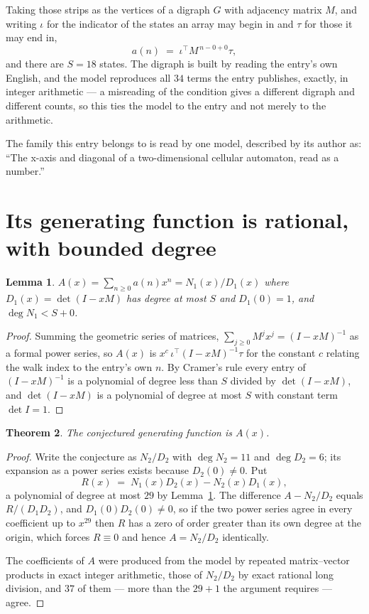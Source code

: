 \documentclass[11pt,a4paper]{article}
\theoremstyle{plain}
\newtheorem{theorem}{Theorem}
\newtheorem{lemma}[theorem]{Lemma}
\theoremstyle{definition}
\begin{document}
Taking those strips as the vertices of a digraph $G$ with adjacency matrix $M$, and writing
$\iota$ for the indicator of the states an array may begin in and $\tau$ for those it may end
in,
\[
a(n)\;=\;\iota^{\!\top}M^{\,n-0+0}\tau ,
\]
and there are $S=18$ states. The digraph is built by reading the entry's own English, and the
model reproduces all $34$ terms the entry publishes, exactly, in integer arithmetic --- a
misreading of the condition gives a different digraph and different counts, so this ties the
model to the entry and not merely to the arithmetic.

The family this entry belongs to is read by one model, described by its author as: ``The x-axis and diagonal of a two-dimensional cellular automaton, read as a number.''


\section{Its generating function is rational, with bounded degree}

\begin{lemma}\label{lem:rat}
$A(x)=\sum_{n\ge0}a(n)x^n=N_1(x)/D_1(x)$ where $D_1(x)=\det(I-xM)$ has degree at most
$S$ and $D_1(0)=1$, and $\deg N_1<S+0$.
\end{lemma}

\begin{proof}
Summing the geometric series of matrices, $\sum_{j\ge0}M^jx^j=(I-xM)^{-1}$ as a formal
power series, so $A(x)$ is $x^{c}\,\iota^{\!\top}(I-xM)^{-1}\tau$ for the constant $c$
relating the walk index to the entry's own $n$. By Cramer's rule every entry of
$(I-xM)^{-1}$ is a polynomial of degree less than $S$ divided by $\det(I-xM)$, and
$\det(I-xM)$ is a polynomial of degree at most $S$ with constant term $\det I=1$.
\end{proof}

\begin{theorem}
The conjectured generating function is $A(x)$.
\end{theorem}

\begin{proof}
Write the conjecture as $N_2/D_2$ with $\deg N_2=11$ and $\deg D_2=6$; its expansion as a
power series exists because $D_2(0)\neq0$. Put
\[
R(x)\;=\;N_1(x)D_2(x)-N_2(x)D_1(x),
\]
a polynomial of degree at most $29$ by Lemma~\ref{lem:rat}. The difference
$A-N_2/D_2$ equals $R/(D_1D_2)$, and $D_1(0)D_2(0)\neq0$, so if the two power series agree in
every coefficient up to $x^{29}$ then $R$ has a zero of order greater than its own
degree at the origin, which forces $R\equiv0$ and hence $A=N_2/D_2$ identically.

The coefficients of $A$ were produced from the model by repeated matrix--vector products in
exact integer arithmetic, those of $N_2/D_2$ by exact rational long division, and $37$
of them --- more than the $29+1$ the argument requires --- agree.
\end{proof}
\end{document}
